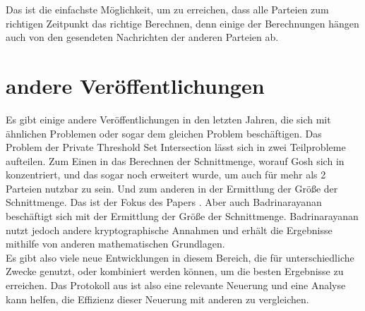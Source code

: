 Das ist die einfachste Möglichkeit, um zu erreichen, dass alle Parteien zum richtigen Zeitpunkt das richtige Berechnen, denn einige der Berechnungen hängen auch von den gesendeten Nachrichten der anderen Parteien ab.\\


\section{andere Veröffentlichungen}
Es gibt einige andere Veröffentlichungen in den letzten Jahren, die sich mit ähnlichen Problemen oder sogar dem gleichen Problem beschäftigen.
Das Problem der Private Threshold Set Intersection lässt sich in zwei Teilprobleme aufteilen. Zum Einen in das Berechnen der Schnittmenge, worauf Gosh sich in \cite{Ghosh2019} konzentriert, und das sogar noch erweitert wurde, um auch für mehr als 2 Parteien nutzbar zu sein.\cite{Doettling2021}  Und zum anderen in der Ermittlung der Größe der Schnittmenge. Das ist der Fokus des Papers \cite{Doettling2021}. Aber auch Badrinarayanan \cite{cryptoeprint:2020:600} beschäftigt sich mit der Ermittlung der Größe der Schnittmenge. Badrinarayanan nutzt jedoch andere kryptographische Annahmen und erhält die Ergebnisse mithilfe von anderen mathematischen Grundlagen. \cite{Doettling2021}\\
Es gibt also viele neue Entwicklungen in diesem Bereich, die für unterschiedliche Zwecke genutzt, oder kombiniert werden können, um die besten Ergebnisse zu erreichen. Das Protokoll aus \cite{Doettling2021} ist also eine relevante Neuerung und eine Analyse kann helfen, die Effizienz dieser Neuerung mit anderen zu vergleichen.


